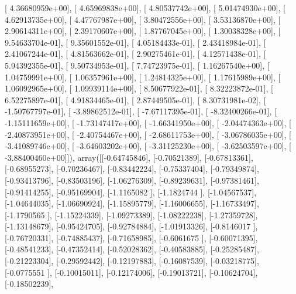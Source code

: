 \documentclass{article}
\begin{document}
       [  4.36680959e+00],
       [  4.65969838e+00],
       [  4.80537742e+00],
       [  5.01474930e+00],
       [  4.62913735e+00],
       [  4.47767987e+00],
       [  3.80472556e+00],
       [  3.53136870e+00],
       [  2.90614311e+00],
       [  2.39170607e+00],
       [  1.87767045e+00],
       [  1.30038328e+00],
       [  9.54633704e-01],
       [  9.35601552e-01],
       [  4.05184433e-01],
       [  2.43418984e-01],
       [  2.41067244e-01],
       [  4.81563662e-01],
       [  2.90275461e-01],
       [  4.12571438e-01],
       [  5.94392355e-01],
       [  9.50734953e-01],
       [  7.74723975e-01],
       [  1.16267540e+00],
       [  1.04759991e+00],
       [  1.06357961e+00],
       [  1.24814325e+00],
       [  1.17615989e+00],
       [  1.06092965e+00],
       [  1.09939114e+00],
       [  8.50677922e-01],
       [  8.32223872e-01],
       [  6.52275897e-01],
       [  4.91834465e-01],
       [  2.87449505e-01],
       [  8.30731981e-02],
       [ -1.50767797e-01],
       [ -3.89862512e-01],
       [ -7.67117395e-01],
       [ -8.32400266e-01],
       [ -1.15111659e+00],
       [ -1.73147417e+00],
       [ -1.66341950e+00],
       [ -2.04474363e+00],
       [ -2.40873951e+00],
       [ -2.40754467e+00],
       [ -2.68611753e+00],
       [ -3.06786035e+00],
       [ -3.41089746e+00],
       [ -3.64603202e+00],
       [ -3.31125230e+00],
       [ -3.62503597e+00],
       [ -3.88400460e+00]]), array([[-0.64745846],
       [-0.70521389],
       [-0.67813361],
       [-0.68955273],
       [-0.70236467],
       [-0.83442224],
       [-0.75337404],
       [-0.79349874],
       [-0.93413796],
       [-0.83503196],
       [-1.06276309],
       [-0.89239631],
       [-0.97381461],
       [-0.91414255],
       [-0.95169904],
       [-1.1165082 ],
       [-1.1824744 ],
       [-1.04567537],
       [-1.04644035],
       [-1.06690924],
       [-1.15895779],
       [-1.16006655],
       [-1.16733497],
       [-1.1790565 ],
       [-1.15224339],
       [-1.09273389],
       [-1.08222238],
       [-1.27359728],
       [-1.13148679],
       [-0.95424705],
       [-0.92784884],
       [-1.01913326],
       [-0.8146017 ],
       [-0.76720331],
       [-0.74885437],
       [-0.71658985],
       [-0.6061675 ],
       [-0.60071395],
       [-0.48541233],
       [-0.47352414],
       [-0.52028362],
       [-0.40583885],
       [-0.25285487],
       [-0.21223304],
       [-0.29592442],
       [-0.12197883],
       [-0.16087539],
       [-0.03218775],
       [-0.0775551 ],
       [-0.10015011],
       [-0.12174006],
       [-0.19013721],
       [-0.10624704],
       [-0.18502239],
\end{document}
